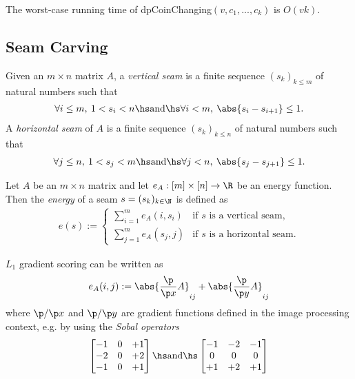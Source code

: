 \documentclass{article}
\begin{document}
\begin{corollary}
	The worst-case running time of \textsf{dpCoinChanging}$(v, c_1, ..., c_k)$
	is $O(vk)$.
\end{corollary}

\subsection{Seam Carving}

\begin{definition}[Seams; L17]
	Given an $m\times n$ matrix $A$, a \emph{vertical seam} is a finite sequence 
	$(s_k)_{k\leq m}$ of natural numbers such that
	\begin{align*}
		\forall i\leq m,\: 1 < s_i < n\hs\text{and}\hs\forall i<m,\: \abs{s_i - s_{i+1}} \leq 1.
	\end{align*}
	A \emph{horizontal seam} of $A$ is a finite sequence $(s_k)_{k\leq n}$ of 
	natural numbers such that
	\begin{align*}
		\forall j\leq n,\: 1 < s_j < m\hs\text{and}\hs\forall j<n,\: \abs{s_j - s_{j+1}} \leq 1.
	\end{align*}
\end{definition}

\begin{definition}[L17]
	Let $A$ be an $m\times n$ matrix and let $e_A:[m]\times[n]\to\R$ be an
	energy function. Then the \emph{energy} of a seam $s=(s_k)_{k\in\N}$ is defined as
	\begin{align*}
		e(s) := \begin{cases}
			\sum_{i=1}^m e_A(i,s_i) &\text{if } s \text{ is a vertical seam},\\
			\sum_{j=1}^m e_A(s_j,j) &\text{if } s \text{ is a horizontal seam}.
		\end{cases}
	\end{align*}
\end{definition}

\begin{definition}[L17]
	$L_1$ gradient scoring can be written as
	\begin{align*}
		e_A(i,j) := \abs{\frac{\p}{\p x} A}_{ij} + \abs{\frac{\p}{\p y} A}_{ij}
	\end{align*}
	where $\p/\p x$ and $\p/\p y$ are gradient functions defined in the image
	processing context, e.g. by using the \emph{Sobal operators}
	\begin{align*}
		\begin{bmatrix}
			-1 & 0 & +1 \\
			-2 & 0 & +2 \\
			-1 & 0 & +1
		\end{bmatrix}
		\hs \text{and} \hs
		\begin{bmatrix}
			-1 & -2 & -1 \\
			0  &  0 &  0 \\
			+1 & +2 & +1
		\end{bmatrix}
	\end{align*}
\end{definition}
\end{document}
